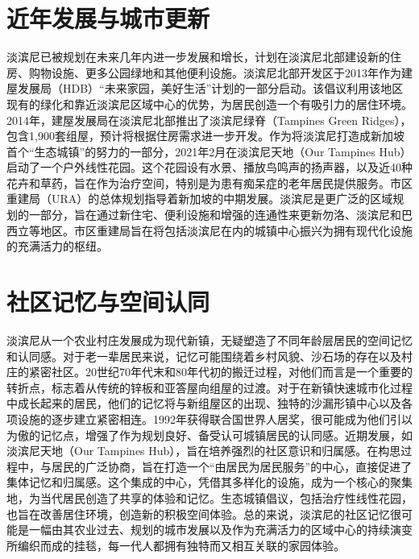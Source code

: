 \documentclass[11pt,a4paper,twoside,openany]{book}
\begin{document}
\section{近年发展与城市更新}
淡滨尼已被规划在未来几年内进一步发展和增长，计划在淡滨尼北部建设新的住房、购物设施、更多公园绿地和其他便利设施。淡滨尼北部开发区于2013年作为建屋发展局（HDB）“未来家园，美好生活”计划的一部分启动。该倡议利用该地区现有的绿化和靠近淡滨尼区域中心的优势，为居民创造一个有吸引力的居住环境。2014年，建屋发展局在淡滨尼北部推出了淡滨尼绿脊（Tampines Green Ridges），包含1,900套组屋，预计将根据住房需求进一步开发。作为将淡滨尼打造成新加坡首个“生态城镇”的努力的一部分，2021年2月在淡滨尼天地（Our Tampines Hub）启动了一个户外线性花园。这个花园设有水景、播放鸟鸣声的扬声器，以及近40种花卉和草药，旨在作为治疗空间，特别是为患有痴呆症的老年居民提供服务。市区重建局（URA）的总体规划指导着新加坡的中期发展。淡滨尼是更广泛的区域规划的一部分，旨在通过新住宅、便利设施和增强的连通性来更新勿洛、淡滨尼和巴西立等地区。市区重建局旨在将包括淡滨尼在内的城镇中心振兴为拥有现代化设施的充满活力的枢纽。

\section{社区记忆与空间认同}
淡滨尼从一个农业村庄发展成为现代新镇，无疑塑造了不同年龄层居民的空间记忆和认同感。对于老一辈居民来说，记忆可能围绕着乡村风貌、沙石场的存在以及村庄的紧密社区。20世纪70年代末和80年代初的搬迁过程，对他们而言是一个重要的转折点，标志着从传统的锌板和亚答屋向组屋的过渡。对于在新镇快速城市化过程中成长起来的居民，他们的记忆将与新组屋区的出现、独特的沙漏形镇中心以及各项设施的逐步建立紧密相连。1992年获得联合国世界人居奖，很可能成为他们引以为傲的记忆点，增强了作为规划良好、备受认可城镇居民的认同感。近期发展，如淡滨尼天地（Our Tampines Hub），旨在培养强烈的社区意识和归属感。在构思过程中，与居民的广泛协商，旨在打造一个“由居民为居民服务”的中心，直接促进了集体记忆和归属感。这个集成的中心，凭借其多样化的设施，成为一个核心的聚集地，为当代居民创造了共享的体验和记忆。生态城镇倡议，包括治疗性线性花园，也旨在改善居住环境，创造新的积极空间体验。总的来说，淡滨尼的社区记忆很可能是一幅由其农业过去、规划的城市发展以及作为充满活力的区域中心的持续演变所编织而成的挂毯，每一代人都拥有独特而又相互关联的家园体验。
\end{document}
